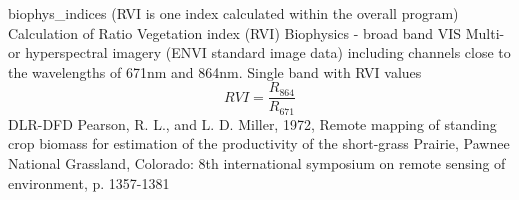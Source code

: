 %
{ %
biophys\_indices (RVI is one index calculated within the overall program)
}
%
{ %
Calculation of Ratio Vegetation index (RVI)
}
%
{ %
Biophysics - broad band VIS
}
%
{ %
Multi- or hyperspectral imagery (ENVI standard image data) including channels close to the wavelengths of 671nm and 864nm.\bigskip
}
%
{ %
Single band with RVI values
}
%
{ %
\begin{displaymath}
RVI = \frac{R_{864}}{R_{671}}
\end{displaymath}
}
%
{ %
DLR-DFD
}
%
{ %
Pearson, R. L., and L. D. Miller, 1972, Remote mapping of standing crop biomass for estimation of the productivity of the short-grass Prairie, Pawnee National Grassland,
Colorado: 8th international symposium on remote sensing of environment, p. 1357-1381
}



